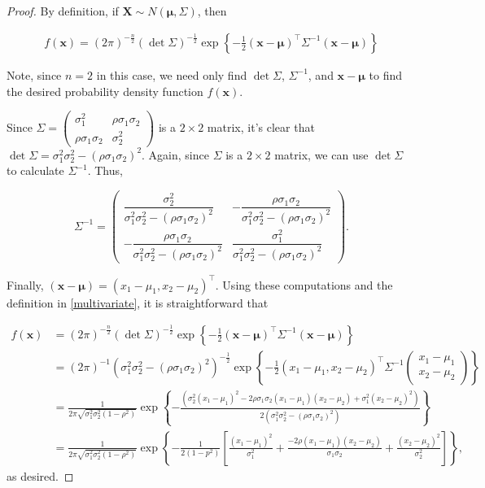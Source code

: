 \documentclass[12pt]{article}
\theoremstyle{definition}
\newcommand{\vect}[1]{\boldsymbol{#1}}
\begin{document}
\begin{proof}
  By definition, if $\vect{X} \sim N(\vect{\mu}, \Sigma)$, then

  \begin{align}\label{multivariate}
    f(\vect{x}) = (2\pi)^{-\frac{n}{2}} (\det{\Sigma})^{-\frac{1}{2}} \exp\left\{ -\frac{1}{2} (\vect{x} - \vect{\mu})^\intercal \Sigma^{-1} (\vect{x} - \vect{\mu}) \right\}
  \end{align}

  Note, since $n=2$ in this case, we need only find $\det{\Sigma}$,
  $\Sigma^{-1}$, and $\vect{x} - \vect{\mu}$ to find the desired probability
  density function $f(\vect{x})$.

  Since $\Sigma = \begin{pmatrix} \sigma_1^2 & \rho\sigma_1\sigma_2 \\ \rho\sigma_1\sigma_2 & \sigma_2^2 \end{pmatrix}$ is
  a $2 \times 2$ matrix, it's clear that $\det{\Sigma} = \sigma_1^2\sigma_2^2 - (\rho\sigma_1\sigma_2)^2$.
  Again, since $\Sigma$ is a $2 \times 2$ matrix, we can use $\det{\Sigma}$ to
  calculate $\Sigma^{-1}$. Thus,

  \[
    \Sigma^{-1} = \begin{pmatrix} \dfrac{\sigma_2^2}{\sigma_1^2\sigma_2^2 - (\rho\sigma_1\sigma_2)^2} & -\dfrac{\rho\sigma_1\sigma_2}{\sigma_1^2\sigma_2^2 - (\rho\sigma_1\sigma_2)^2} \\ -\dfrac{\rho\sigma_1\sigma_2}{\sigma_1^2\sigma_2^2 - (\rho\sigma_1\sigma_2)^2} & \dfrac{\sigma_1^2}{\sigma_1^2\sigma_2^2 - (\rho\sigma_1\sigma_2)^2} \end{pmatrix}.
  \]

  Finally, $(\vect{x} - \vect{\mu}) = (x_1 - \mu_1, x_2 - \mu_2)^\intercal$. Using
  these computations and the definition in \eqref{multivariate}, it is
  straightforward that

  \begin{align*}
    f(\vect{x})
    &= (2\pi)^{-\frac{n}{2}} (\det{\Sigma})^{-\frac{1}{2}} \exp\left\{ -\frac{1}{2} (\vect{x} - \vect{\mu})^\intercal \Sigma^{-1} (\vect{x} - \vect{\mu}) \right\} \\
    &= (2\pi)^{-1} (\sigma_1^2\sigma_2^2 - (\rho\sigma_1\sigma_2)^2)^{-\frac{1}{2}} \exp\left\{ -\frac{1}{2} (x_1 - \mu_1, x_2 - \mu_2)^\intercal \Sigma^{-1} \begin{pmatrix}x_1 - \mu_1 \\ x_2 - \mu_2\end{pmatrix} \right\} \\
    &= \frac{1}{2\pi\sqrt{\sigma_1^2\sigma_2^2(1 - \rho^2)}} \exp\left\{ -\frac{(\sigma_2^2(x_1-\mu_1)^2 -2\rho\sigma_1\sigma_2(x_1 - \mu_1)(x_2 - \mu_2) + \sigma_1^2(x_2 - \mu_2)^2)}{2(\sigma_1^2\sigma_2^2 - (\rho\sigma_1\sigma_2)^2)}  \right\} \\
    &= \frac{1}{2\pi\sqrt{\sigma_1^2\sigma_2^2(1 - \rho^2)}} \exp\left\{ -\frac{1}{2(1-p^2)} \left[ \frac{(x_1 - \mu_1)^2}{\sigma_1^2} + \frac{-2\rho(x_1 - \mu_1)(x_2 - \mu_2)}{\sigma_1\sigma_2} + \frac{(x_2 - \mu_2)^2}{\sigma_2^2} \right]\right\},
  \end{align*}
  as desired.

\end{proof}
\end{document}
